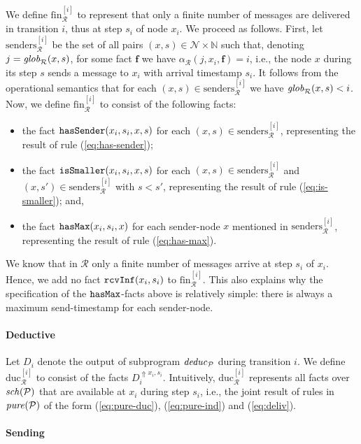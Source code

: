 \documentclass{tlp}
\newcommand{\Nat}{\mathbb{N}}  \newcommand{\len}[1]{|#1|} \newcommand{\rom}[1]{\text{\emph{(#1)}}} \newcommand{\romI}{\rom i}
\newcommand{\ded}{\mathcal{P}}
\newcommand{\fc}{\boldsymbol{f}}
\newcommand{\schof}[1]{\fname{sch}(#1)}
\newcommand{\nw}{\mathcal{N}}
\newcommand{\addlt}[3]{#1^{\Uparrow#2,#3}}
\newcommand{\rcvinf}{\pred{rcvInf}}
\newcommand{\issmaller}{\pred{isSmaller}}
\newcommand{\hasmax}{\pred{hasMax}}
\newcommand{\hassender}{\pred{hasSender}}
\newcommand{\pure}[1]{\fname{pure}(#1)}
\newcommand{\run}{\mathcal{R}}
\newcommand{\deduc}[1]{\fname{deduc}_{#1}}
\newcommand{\globR}[1]{\fname{glob}_{\run}(#1)}
\newcommand{\nwnat}{\nw\times\Nat}
\newcommand{\arr}{\alpha_{\run}}
\newcommand{\slicefin}[1]{\text{fin}_{\run}^{[#1]}}
\newcommand{\sliceduc}[1]{\text{duc}_{\run}^{[#1]}}
\newcommand{\senders}[1]{\text{senders}_{\run}^{[#1]}}
\begin{document}
We define $\slicefin i$ to represent that only a finite number of
messages are delivered in transition $i$, thus at step $s_{i}$ of
node $x_{i}$. We proceed as follows. First, let $\senders i$ be
the set of all pairs $(x,s)\in\nwnat$ such that, denoting $j=\globR{x,s}$,
for some fact $\fc$ we have $\arr(j,x_{i},\fc)=i$, i.e., the node
$x$ during its step $s$ sends a message to $x_{i}$ with arrival
timestamp $s_{i}$. It follows from the operational semantics that
for each $(x,s)\in\senders i$ we have $\globR{x,s}<i$. Now, we define
$\slicefin i$ to consist of the following facts:
\begin{itemize}
\item the fact $\hassender(x_{i},s_{i},x,s)$ for each $(x,s)\in\senders i$,
representing the result of rule (\ref{eq:has-sender});
\item the fact $\issmaller(x_{i},s_{i},x,s)$ for each $(x,s)\in\senders i$
and $(x,s')\in\senders i$ with $s<s'$, representing the result of
rule (\ref{eq:is-smaller}); and,
\item the fact $\hasmax(x_{i},s_{i},x)$ for each sender-node $x$ mentioned
in $\senders i$, representing the result of rule (\ref{eq:has-max}).
\end{itemize}
We know that in $\run$ only a finite number of messages arrive at
step $s_{i}$ of $x_{i}$. Hence, we add no fact $\rcvinf(x_{i},s_{i})$
to $\slicefin i$.  This also explains why the specification of the
$\hasmax$-facts above is relatively simple: there is always a maximum
send-timestamp for each sender-node.




\paragraph*{Deductive}

Let $D_{i}$ denote the output of subprogram $\deduc{\ded}$ during
transition $i$. We define $\sliceduc i$ to consist of the facts
$\addlt{D_{i}}{x_{i}}{s_{i}}$. Intuitively, $\sliceduc i$ represents
all facts over $\schof{\ded}$ that are available at $x_{i}$ during
step $s_{i}$, i.e., the joint result of rules in $\pure{\ded}$ of
the form (\ref{eq:pure-duc}), (\ref{eq:pure-ind}) and (\ref{eq:deliv}). 




\paragraph*{Sending}
\end{document}
